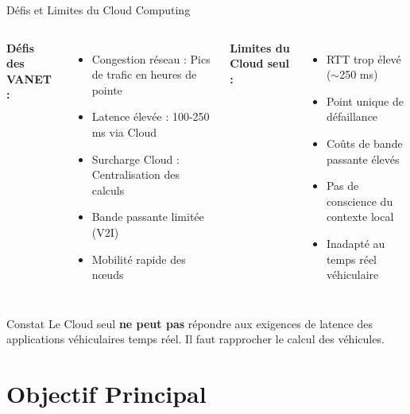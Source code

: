 \documentclass[10pt,aspectratio=169]{beamer}
\begin{document}
\begin{frame}{D\'efis et Limites du Cloud Computing}
\begin{columns}
\textbf{D\'efis des VANET :}
\begin{itemize}
    \item \textcolor{fogred}{Congestion r\'eseau} : Pics de trafic en heures de pointe
    \item \textcolor{fogred}{Latence \'elev\'ee} : 100-250 ms via Cloud
    \item \textcolor{fogred}{Surcharge Cloud} : Centralisation des calculs
    \item Bande passante limit\'ee (V2I)
    \item Mobilit\'e rapide des n\oe uds
\end{itemize}

\textbf{Limites du Cloud seul :}
\begin{itemize}
    \item[$\times$] RTT trop \'elev\'e ($\sim$250 ms)
    \item[$\times$] Point unique de d\'efaillance
    \item[$\times$] Co\^uts de bande passante \'elev\'es
    \item[$\times$] Pas de conscience du contexte local
    \item[$\times$] Inadapt\'e au temps r\'eel v\'ehiculaire
\end{itemize}
\end{columns}

\vspace{0.3cm}
\begin{block}{Constat}
Le Cloud seul \textbf{ne peut pas} r\'epondre aux exigences de latence des applications v\'ehiculaires temps r\'eel. Il faut rapprocher le calcul des v\'ehicules.
\end{block}
\end{frame}

\section{Objectif Principal}
\end{document}
